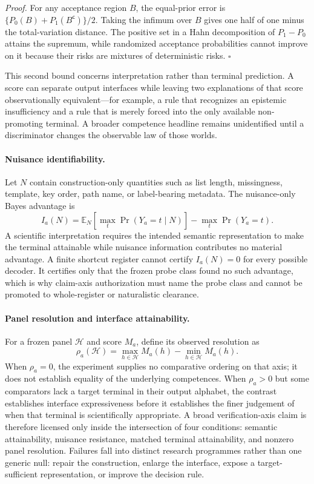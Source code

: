 \emph{Proof.}  For any acceptance region $B$, the equal-prior error is
$\{P_0(B)+P_1(B^{\mathsf c})\}/2$.  Taking the infimum over $B$ gives
one half of one minus the total-variation distance.  The positive set in a
Hahn decomposition of $P_1-P_0$ attains the supremum, while randomized
acceptance probabilities cannot improve on it because their risks are mixtures
of deterministic risks. \hfill$\square$

This second bound concerns interpretation rather than terminal prediction.  A
score can separate output interfaces while leaving two explanations of that
score observationally equivalent---for example, a rule that recognizes an
epistemic insufficiency and a rule that is merely forced into the only
available non-promoting terminal.  A broader competence headline remains
unidentified until a discriminator changes the observable law of those worlds.

\paragraph{Nuisance identifiability.}
Let $N$ contain construction-only quantities such as list length, missingness,
template, key order, path name, or label-bearing metadata.  The nuisance-only
Bayes advantage is
\begin{equation}
  I_a(N)=\mathbb{E}_{N}\!\left[\max_t\Pr(Y_a=t\mid N)\right]
  -\max_t\Pr(Y_a=t).
\end{equation}
A scientific interpretation requires the intended semantic representation to
make the terminal attainable while nuisance information contributes no material
advantage.  A finite shortcut register cannot certify $I_a(N)=0$ for every
possible decoder.  It certifies only that the frozen probe class found no such
advantage, which is why claim-axis authorization must name the probe class and
cannot be promoted to whole-register or naturalistic clearance.

\paragraph{Panel resolution and interface attainability.}
For a frozen panel $\mathcal{H}$ and score $M_a$, define its observed resolution
as
\[
  \rho_a(\mathcal{H})=\max_{h\in\mathcal{H}}M_a(h)
  -\min_{h\in\mathcal{H}}M_a(h).
\]
When $\rho_a=0$, the experiment supplies no comparative ordering on that axis;
it does not establish equality of the underlying competences.  When
$\rho_a>0$ but some comparators lack a target terminal in their output alphabet,
the contrast establishes interface expressiveness before it establishes the
finer judgement of when that terminal is scientifically appropriate.  A broad
verification-axis claim is therefore licensed only inside the intersection of
four conditions: semantic attainability, nuisance resistance, matched terminal
attainability, and nonzero panel resolution.  Failures fall into distinct
research programmes rather than one generic null: repair the construction,
enlarge the interface, expose a target-sufficient representation, or improve
the decision rule.

